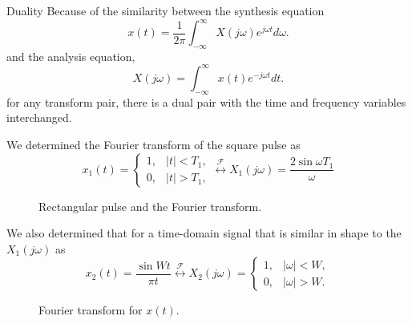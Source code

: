 \begin{frame}{Duality}
    Because of the similarity between the synthesis equation
    \begin{equation}
        x(t) = \frac{1}{2\pi}\int_{-\infty}^{\infty}X(j\omega)e^{j\omega t} d\omega.
    \end{equation}
    and the analysis equation,
    \begin{equation}
        X(j\omega) = \int_{-\infty}^{\infty}x(t)e^{-j\omega t} dt.
    \end{equation}
    for any transform pair, there is a dual pair with the time and frequency variables interchanged.
\end{frame}

\begin{frame}

        We determined the Fourier transform of the square pulse as
        \begin{equation*}
            x_1(t) = \begin{cases}
                1,& |t| < T_1,\\
                0, & |t| > T_1,
            \end{cases}
             \overset{\mathcal{F}}{\longleftrightarrow}
             X_1(j\omega) = \frac{2\sin \omega T_1}{\omega}
        \end{equation*}

        \begin{figure}
          \centering
          
          \caption{Rectangular pulse and the Fourier transform.}\label{fi:square_pulse}
        \end{figure}

\end{frame}


\begin{frame}
        We also determined that for a time-domain signal that is similar in shape to the $X_1(j\omega)$ as
        \begin{equation*}
        x_2(t) = \frac{\sin W t}{\pi t}
         \overset{\mathcal{F}}{\longleftrightarrow}
            X_2(j\omega) = \begin{cases}
                1,& |\omega| < W,\\
                0, & |\omega| > W.
            \end{cases}
        \end{equation*}
        \begin{figure}
          \centering
          
          \caption{Fourier transform for $x(t)$.}\label{fi:xomega_square}
        \end{figure}
\end{frame}



